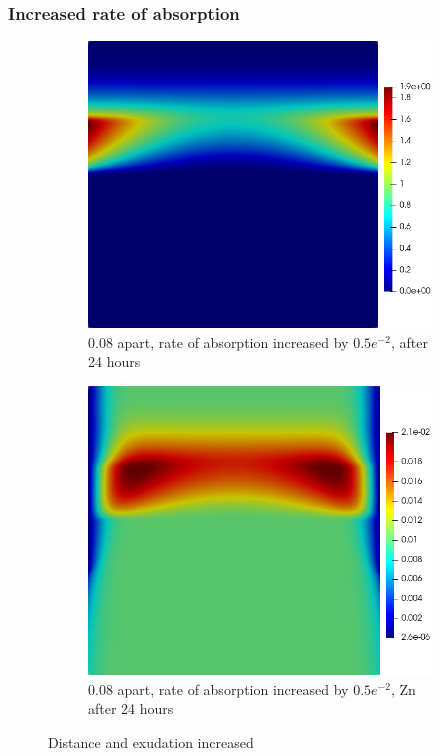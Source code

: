 \documentclass[11pt]{article}
\numberwithin{equation}{section}
\begin{document}
 \subsubsection{Increased rate of  absorption}
 \begin{figure}
     \centering
     \begin{subfigure}[t]{0.35\textwidth}
     \includegraphics[width=\textwidth]{Figures/testpics/IncreasedZnAbsorbDMA24.png}
     \caption{0.08 apart, rate of  absorption increased by $0.5e^{-2}$,  after 24 hours}
     \end{subfigure}
     \hspace{1cm}
     \begin{subfigure}[t]{0.35\textwidth}
     \includegraphics[width=\textwidth]{Figures/testpics/IncreasedZnAbsorbZn24.png}
     \caption{0.08 apart, rate of  absorption increased by $0.5e^{-2}$, Zn after 24 hours}
     \end{subfigure}
     \caption{Distance and  exudation increased}
 \end{figure}
\end{document}
